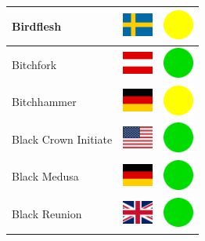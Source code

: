 \documentclass[12pt, a4paper, twoside]{report}
\begin{document}
\begin{center}
\begin{longtable}{|p{5cm}|p{2cm}|p{2cm}|}
Birdflesh & \includegraphics[width=1cm]{4x3/se} & \includegraphics[width=1cm]{likes/m} \\ \hline
Bitchfork & \includegraphics[width=1cm]{4x3/at} & \includegraphics[width=1cm]{likes/y} \\ \hline
Bitchhammer & \includegraphics[width=1cm]{4x3/de} & \includegraphics[width=1cm]{likes/m} \\ \hline
Black Crown Initiate & \includegraphics[width=1cm]{4x3/us} & \includegraphics[width=1cm]{likes/y} \\ \hline
Black Medusa & \includegraphics[width=1cm]{4x3/de} & \includegraphics[width=1cm]{likes/y} \\ \hline
Black Reunion & \includegraphics[width=1cm]{4x3/gb} & \includegraphics[width=1cm]{likes/y} \\ \hline

\end{longtable}
\end{center}
\end{document}
